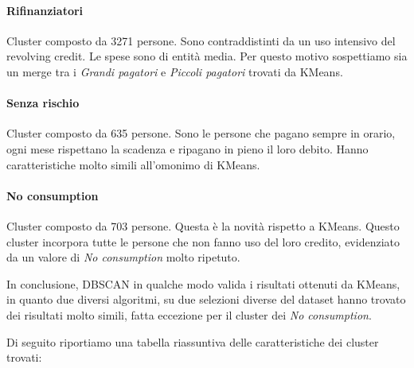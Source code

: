 \paragraph{Rifinanziatori}
Cluster composto da 3271 persone. Sono contraddistinti da un uso 
intensivo del revolving credit. Le spese sono di entit\`a media.
Per questo motivo sospettiamo sia un merge tra i
\textit{Grandi pagatori} e \textit{Piccoli pagatori} trovati
da KMeans.

\paragraph{Senza rischio}
Cluster composto da 635 persone. Sono le persone che pagano
sempre in orario, ogni mese rispettano la scadenza e
ripagano in pieno il loro debito. Hanno caratteristiche
molto simili all'omonimo di KMeans.

\paragraph{No consumption}
Cluster composto da 703 persone. Questa \`e la novit\`a 
rispetto a KMeans. Questo cluster incorpora tutte le persone
che non fanno uso del loro credito, evidenziato da un valore
di \textit{No consumption} molto ripetuto.

In conclusione, DBSCAN in qualche modo valida i risultati
ottenuti da KMeans, in quanto due diversi algoritmi, su due
selezioni diverse del dataset hanno trovato dei risultati
molto simili, fatta eccezione per il cluster dei
\textit{No consumption}.

Di seguito riportiamo una tabella riassuntiva delle
caratteristiche dei cluster trovati:

